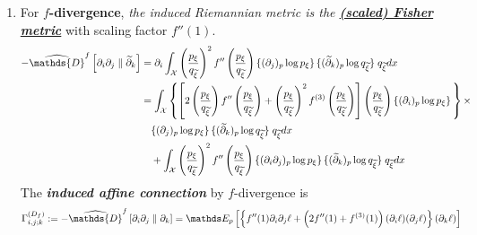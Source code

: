 \documentclass[11pt]{article}
\begin{document}
\begin{itemize}
\begin{example}
\begin{enumerate}
\item For \textbf{$f$-divergence}, \emph{the induced Riemannian metric is the \underline{\textbf{(scaled) Fisher metric}}} with scaling factor $f''(1)$. 
\begin{align*}
 - \widehat{\mathds{D}}^{f}\left[ \partial_i \partial_j \;\|\;  \widetilde{\partial}_k \right] &= \partial_i\int_{\cX}\paren{\frac{p_{\xi}}{q_{\widetilde{\xi}}}}^2 f''\paren{\frac{p_{\xi}}{q_{\widetilde{\xi}}}} \{(\partial_j)_p \log p_{\xi}\}\,\{(\widetilde{\partial}_k)_p \log q_{\widetilde{\xi}}\}\;   q_{\widetilde{\xi}}  dx \\
 &= \int_{\cX}\set{\brac{2\paren{\frac{p_{\xi}}{q_{\widetilde{\xi}}}} f''\paren{\frac{p_{\xi}}{q_{\widetilde{\xi}}}} + \paren{\frac{p_{\xi}}{q_{\widetilde{\xi}}}}^2 f^{(3)}\paren{\frac{p_{\xi}}{q_{\widetilde{\xi}}}}}\paren{\frac{p_{\xi}}{q_{\widetilde{\xi}}}} \{(\partial_i)_p  \log p_{\xi}\}\, } \times \\
 &\quad  \{(\partial_j)_p \log p_{\xi}\}\,\{(\widetilde{\partial}_k)_p \log q_{\widetilde{\xi}}\}\;   q_{\widetilde{\xi}}  dx \\
 &\quad + \int_{\cX}\paren{\frac{p_{\xi}}{q_{\widetilde{\xi}}}}^2 f''\paren{\frac{p_{\xi}}{q_{\widetilde{\xi}}}}  \{(\partial_i \partial_j)_p \log p_{\xi}\}\,\{(\widetilde{\partial}_k)_p \log q_{\widetilde{\xi}}\}\;    q_{\widetilde{\xi}}  dx
\end{align*}
The \emph{\textbf{induced affine connection}} by $f$-divergence is
\begin{align}
\Gamma_{i,j;k}^{(D_f)} &:= - \widehat{\mathds{D}}^{f}\left[ \partial_i \partial_j \;\|\;  \partial_k \right] =\E{p}{\set{f''(1)\partial_i \partial_j \ell + \paren{2f''(1) + f^{(3)}(1)}(\partial_i \ell)(\partial_j \ell)}(\partial_k \ell)} \label{eqn: f_divergence_affine_connection}
\end{align}
\end{enumerate}
\end{example} 



\end{itemize}
\end{document}
